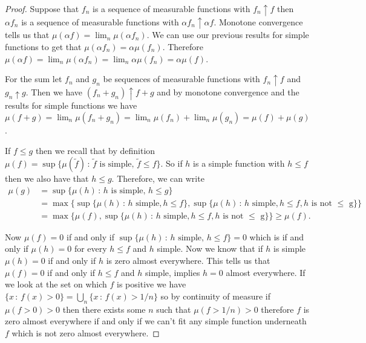 \documentclass[11pt]{article}
\theoremstyle{definition}
\theoremstyle{remark}
\begin{document}
\begin{proof}
Suppose that $f_n$ is a sequence of measurable functions with $f_n \uparrow f$ then $\alpha f_n$ is a sequence of measurable functions with $\alpha f_n \uparrow \alpha f$. Monotone convergence tells us that $\mu(\alpha f) = \lim_n \mu(\alpha f_n)$. We can use our previous results for simple functions to get that $\mu(\alpha f_n) = \alpha \mu(f_n)$. Therefore $\mu(\alpha f) = \lim_n \mu(\alpha f_n) = \lim_n \alpha \mu(f_n) = \alpha \mu(f)$.

For the sum let $f_n$ and $g_n$ be sequences of measurable functions with $f_n \uparrow f$ and $g_n \uparrow g$. Then we have $(f_n + g_n) \uparrow f+g$ and by monotone convergence and the results for simple functions we have $\mu(f+g) = \lim_n \mu(f_n + g_n) = \lim_n \mu(f_n) + \lim_n \mu(g_n) = \mu(f) + \mu(g)$.

If $f \leq g$ then we recall that by definition $\mu(f) = \sup\{ \mu(\tilde{f}) \,:\, \mbox{$\tilde{f}$ is simple},\, \tilde{f} \leq f\}$. So if $h$ is a simple function with $h \leq f$ then we also have that $h \leq g$. Therefore, we can write
\begin{align*} \mu(g) &= \sup\{ \mu(h) \,:\, \mbox{$h$ is simple},\, h \leq g\} \\ &= \max\{\sup\{ \mu(h)\, :\, \mbox{$h$ simple}, h \leq f\}, \sup\{ \mu(h)\, :\, \mbox{$h$ simple}, h \leq f, \mbox{$h$ is not $\leq$ g}\} \}\\ &= \max\{ \mu(f), \sup\{ \mu(h)\, :\, \mbox{$h$ simple}, h \leq f, \mbox{$h$ is not $\leq$ g}\}\} \geq \mu(f).\end{align*}

Now $\mu(f) = 0$ if and only if $\sup\{ \mu(h) \,:\, \mbox{$h$ simple},\, h \leq f\} = 0$ which is if and only if $\mu(h) = 0$ for every $h \leq f$ and $h$ simple. Now we know that if $h$ is simple $\mu(h) = 0$ if and only if $h$ is zero almost everywhere. This tells us that $\mu(f) = 0$ if and only if $h \leq f$ and $h$ simple, implies $h = 0$ almost everywhere. If we look at the set on which $f$ is positive we have $\{x\,:\, f(x)>0\} = \bigcup_n \{ x \,:\, f(x) > 1/n\}$ so by continuity of measure if $\mu( f>0)>0$ then there exists some $n$ such that $\mu(f >1/n)>0$ therefore $f$ is zero almost everywhere if and only if we can't fit any simple function underneath $f$ which is not zero almost everywhere.
\end{proof}
\end{document}
